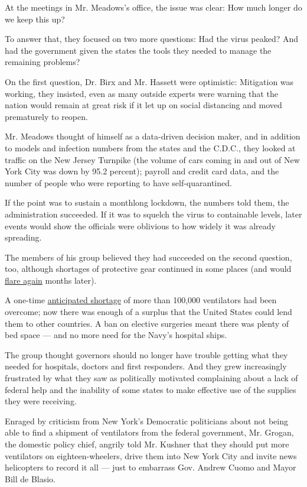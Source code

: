 At the meetings in Mr. Meadows's office, the issue was clear: How much
longer do we keep this up?

To answer that, they focused on two more questions: Had the virus
peaked? And had the government given the states the tools they needed to
manage the remaining problems?

On the first question, Dr. Birx and Mr. Hassett were optimistic:
Mitigation was working, they insisted, even as many outside experts were
warning that the nation would remain at great risk if it let up on
social distancing and moved prematurely to reopen.

Mr. Meadows thought of himself as a data-driven decision maker, and in
addition to models and infection numbers from the states and the C.D.C.,
they looked at traffic on the New Jersey Turnpike (the volume of cars
coming in and out of New York City was down by 95.2 percent); payroll
and credit card data, and the number of people who were reporting to
have self-quarantined.

If the point was to sustain a monthlong lockdown, the numbers told them,
the administration succeeded. If it was to squelch the virus to
containable levels, later events would show the officials were oblivious
to how widely it was already spreading.

The members of his group believed they had succeeded on the second
question, too, although shortages of protective gear continued in some
places (and would
\href{https://www.nytimes3xbfgragh.onion/2020/07/08/health/coronavirus-masks-ppe-doc.html}{flare
again} months later).

A one-time
\href{https://www.whitehouse.gov/briefings-statements/remarks-president-trump-vice-president-pence-members-coronavirus-task-force-press-briefing-13/}{anticipated
shortage} of more than 100,000 ventilators had been overcome; now there
was enough of a surplus that the United States could lend them to other
countries. A ban on elective surgeries meant there was plenty of bed
space --- and no more need for the Navy's hospital ships.

The group thought governors should no longer have trouble getting what
they needed for hospitals, doctors and first responders. And they grew
increasingly frustrated by what they saw as politically motivated
complaining about a lack of federal help and the inability of some
states to make effective use of the supplies they were receiving.

Enraged by criticism from New York's Democratic politicians about not
being able to find a shipment of ventilators from the federal
government, Mr. Grogan, the domestic policy chief, angrily told Mr.
Kushner that they should put more ventilators on eighteen-wheelers,
drive them into New York City and invite news helicopters to record it
all --- just to embarrass Gov. Andrew Cuomo and Mayor Bill de Blasio.

